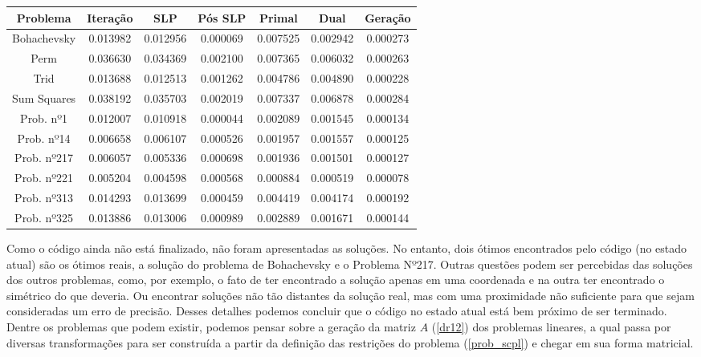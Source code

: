 {
  \begin{center}
    \begin{small}
      \begin{tabular}{||c|c|c|c|c|c|c||}
        \hline
        Problema & Iteração & SLP & Pós SLP & Primal & Dual & Geração \\ [0.5ex] 
        \hline\hline

        Bohachevsky & 0.013982 & 0.012956 & 0.000069 & 0.007525 & 0.002942 & 0.000273 \\
        \hline
        Perm        & 0.036630 & 0.034369 & 0.002100 & 0.007365 & 0.006032 & 0.000263 \\
        \hline
        Trid        & 0.013688 & 0.012513 & 0.001262 & 0.004786 & 0.004890 & 0.000228 \\
        \hline
        Sum Squares & 0.038192 & 0.035703 & 0.002019 & 0.007337 & 0.006878 & 0.000284 \\
        \hline
        Prob. nº1   & 0.012007 & 0.010918 & 0.000044 & 0.002089 & 0.001545 & 0.000134 \\
        \hline
        Prob. nº14  & 0.006658 & 0.006107 & 0.000526 & 0.001957 & 0.001557 & 0.000125 \\
        \hline
        Prob. nº217 & 0.006057 & 0.005336 & 0.000698 & 0.001936 & 0.001501 & 0.000127 \\
        \hline
        Prob. nº221 & 0.005204 & 0.004598 & 0.000568 & 0.000884 & 0.000519 & 0.000078 \\
        \hline
        Prob. nº313 & 0.014293 & 0.013699 & 0.000459 & 0.004419 & 0.004174 & 0.000192 \\
        \hline
        Prob. nº325 & 0.013886 & 0.013006 & 0.000989 & 0.002889 & 0.001671 & 0.000144 \\
        \hline

      \end{tabular}
    \end{small}
  \end{center}
}

Como o código ainda não está finalizado, não foram apresentadas as soluções. No entanto,
dois ótimos encontrados pelo código (no estado atual) são os ótimos reais, a solução do
problema de Bohachevsky e o Problema Nº217. Outras questões podem ser percebidas das
soluções dos outros problemas, como, por exemplo, o fato de ter encontrado a solução
apenas em uma coordenada e na outra ter encontrado o simétrico do que deveria. Ou
encontrar soluções não tão distantes da solução real, mas com uma proximidade não
suficiente para que sejam consideradas um erro de precisão. Desses detalhes podemos
concluir que o código no estado atual está bem próximo de ser terminado. Dentre os
problemas que podem existir, podemos pensar sobre a geração da matriz \(A\) (\ref{dr12})
dos problemas lineares, a qual passa por diversas transformações para ser construída
a partir da definição das restrições do problema (\ref{prob_scpl}) e chegar em sua forma
matricial.